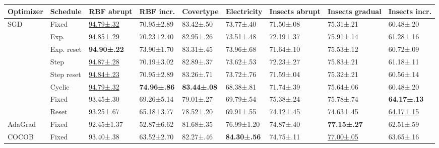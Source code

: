 \begin{tabular}{lllllllll}
    \toprule
    Optimizer                & Schedule   & RBF abrupt             & RBF incr.           & Covertype           & Electricity         & Insects abrupt & Insects gradual       & Insects incr.         \\
    \midrule
    \multirow[c]{8}{*}{SGD}  & Fixed      & \underline{94.79±.32}  & 70.95±2.89          & 83.42±.50           & 73.77±.40           & 71.50±.08      & 75.31±.21             & 60.48±.20             \\
                             & Exp.       & \underline {94.85±.29} & 70.23±2.40          & 82.95±.26           & 73.51±.48           & 72.19±.37      & 75.91±.14             & 61.28±.16             \\
                             & Exp. reset & \bfseries 94.90±.22    & 73.90±1.70          & 83.31±.45           & 73.96±.68           & 71.64±.10      & 75.53±.12             & 60.72±.09             \\
                             & Step       & \underline{94.87±.28}  & 70.19±3.02          & 82.89±.37           & 73.62±.53           & 72.23±.27      & 75.83±.21             & 61.18±.11             \\
                             & Step reset & \underline{94.84±.23}  & 70.95±2.89          & 83.26±.71           & 73.72±.76           & 71.59±.04      & 75.32±.21             & 60.56±.14             \\
                             & Cyclic     & \underline{94.79±.32}  & \bfseries 74.96±.86 & \bfseries 83.44±.08 & 68.38±.81           & 71.74±.39      & 75.64±.06             & 60.48±.20             \\
    \multirow[c]{8}{*}{Adam} & Fixed      & 93.45±.30              & 69.26±5.14          & 79.01±.27           & 69.79±.54           & 75.38±.24      & 75.78±.74             & \bfseries 64.17±.13   \\
                             & Reset      & 93.25±.67              & 65.18±3.77          & 78.52±.20           & 69.91±.55           & 74.12±.45      & 74.63±.45             & \underline{64.17±.15} \\
    AdaGrad                  & Fixed      & 92.45±1.37             & 52.87±6.62          & 81.68±.35           & 76.99±1.20          & 74.87±.40      & \bfseries 77.15±.27   & 62.51±.59             \\
    COCOB                    & Fixed      & 93.40±.38              & 63.52±2.70          & 82.27±.46           & \bfseries 84.30±.56 & 74.75±.11      & \underline{77.00±.05} & 63.65±.16             \\

\end{tabular}

